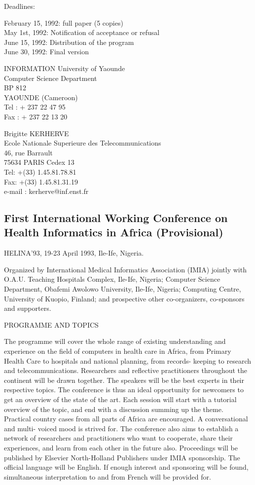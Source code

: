 Deadlines:

     February 15, 1992: full paper (5 copies)\\
     May 1st, 1992: Notification of acceptance or refusal\\
     June 15, 1992: Distribution of the program\\
     June 30, 1992: Final version

INFORMATION
University of Yaounde\\
Computer Science Department\\
BP  812\\
YAOUNDE (Cameroon)\\
Tel : + 237 22 47 95\\
Fax : + 237 22 13 20

Brigitte KERHERVE\\
Ecole Nationale Superieure des Telecommunications\\
46, rue Barrault\\
75634 PARIS Cedex 13\\
Tel: +(33) 1.45.81.78.81\\
Fax: +(33) 1.45.81.31.19\\
e-mail : kerherve@inf.enst.fr

\subsection{First International Working Conference on Health
Informatics in Africa (Provisional)} 
HELINA'93, 19-23 April 1993, Ile-Ife, Nigeria.

Organized by International Medical Informatics Association (IMIA)
jointly with O.A.U. Teaching Hospitals Complex, Ile-Ife, Nigeria;
Computer Science Department, Obafemi Awolowo University, Ile-Ife,
Nigeria; Computing Centre, University of Kuopio, Finland; and
prospective other co-organizers, co-sponsors and supporters.  

PROGRAMME AND TOPICS

The programme will cover the whole range of existing understanding and
experience on the field of computers in health care in Africa, from
Primary Health Care to hospitals and national planning, from records-
keeping to research and telecommunications. Researchers and reflective
practitioners throughout the continent will be drawn together. The
speakers will be the best experts in their respective topics. The
conference is thus an ideal opportunity for newcomers to get an
overview of the state of the art.
    Each session will start with a tutorial overview of the topic, and
end with a discussion summing up the theme. Practical country cases
from all parts of Africa are encouraged. A conversational and multi-
voiced mood is strived for. The conference also aims to establish a
network of researchers and practitioners who want to cooperate, share
their experiences, and learn from each other in the future also.
    Proceedings will be published by Elsevier North-Holland Publishers
under IMIA sponsorship.
    The official language will be English. If enough interest and
sponsoring will be found, simultaneous interpretation to and from
French will be provided for.

